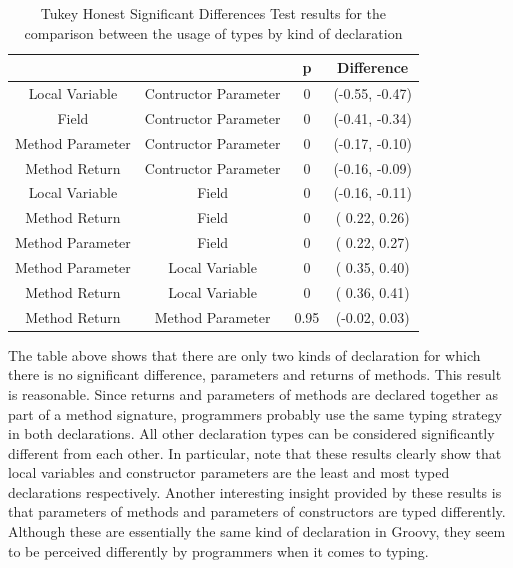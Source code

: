 \documentclass[]{sigplanconf}
\renewcommand{\arraystretch}{1.2}
\begin{document}
\begin{table}[ht]

\centering{}%
\renewcommand{\arraystretch}{1.2}
\small
\begin{tabular}{|c|c|c|c|}
\hline 
								& {}					& p  	      & Difference \\
\hline
\hline
Local Variable & Contructor Parameter & 0      & (-0.55, -0.47) \\ \hline
Field & Contructor Parameter & 0      & (-0.41, -0.34) \\ \hline
Method Parameter & Contructor Parameter & 0      & (-0.17, -0.10) \\ \hline
Method Return & Contructor Parameter & 0      & (-0.16, -0.09) \\ \hline
Local Variable & Field & 0      & (-0.16, -0.11) \\ \hline
Method Return & Field & 0      & ( 0.22,  0.26) \\ \hline
Method Parameter & Field & 0      & ( 0.22,  0.27) \\ \hline
Method Parameter& Local Variable & 0      & ( 0.35,  0.40) \\ \hline
Method Return & Local Variable & 0      & ( 0.36,  0.41) \\ \hline
Method Return & Method Parameter& 0.95 & (-0.02,  0.03) \\ \hline
\end{tabular}
\caption{Tukey Honest Significant Differences Test results for the comparison between the usage of types by kind of declaration}
\label{tab:all_utest_type}
\end{table}




The table above shows that there are only two kinds of declaration for which there is no significant difference, parameters and returns of methods.
This result is reasonable.
Since returns and parameters of methods are declared together as part of a method signature, programmers probably use the same typing strategy in both declarations.
All other declaration types can be considered significantly different from each other.
In particular, note that these results clearly show that local variables and constructor parameters are the least and most typed declarations respectively.
Another interesting insight provided by these results is that parameters of methods and parameters of constructors are typed differently.
Although these are essentially the same kind of declaration in Groovy, they seem to be perceived differently by programmers when it comes to typing.
\end{document}
